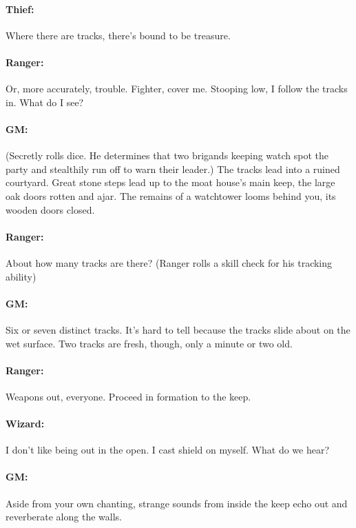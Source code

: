 \begin{multicols}{2}
\paragraph{Thief:} Where there are tracks, there's bound to be treasure.

\paragraph{Ranger:} Or, more accurately, trouble.  Fighter, cover me.  Stooping low, I follow the tracks in.  What do I see?

\paragraph{GM:} (Secretly rolls dice.  He determines that two brigands keeping watch spot the party and stealthily run off to warn their leader.) The tracks lead into a ruined courtyard.  Great stone steps lead up to the moat house's main keep, the large oak doors rotten and ajar.  The remains of a watchtower looms behind you, its wooden doors closed.

\paragraph{Ranger:} About how many tracks are there? (Ranger rolls a skill check for his tracking ability)

\paragraph{GM:} Six or seven distinct tracks.  It's hard to tell because the tracks slide about on the wet surface.  Two tracks are fresh, though, only a minute or two old.

\paragraph{Ranger:} Weapons out, everyone. Proceed in formation to the keep.

\paragraph{Wizard:} I don't like being out in the open.  I cast shield on myself.  What do we hear?

\paragraph{GM:} Aside from your own chanting, strange sounds from inside the keep echo out and reverberate along the walls.


\end{multicols}
